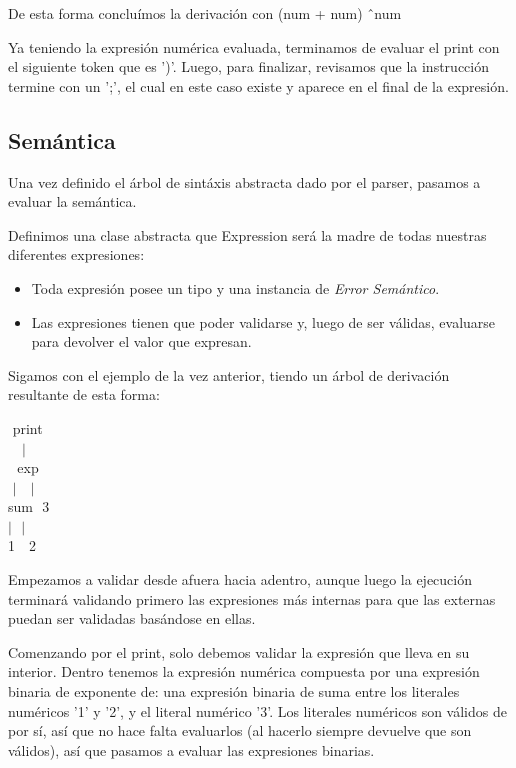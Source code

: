 \documentclass[12pt]{article}
\begin{document}
	De esta forma concluímos la derivación con (num + num) \^\ num
	
	Ya teniendo la expresión numérica evaluada, terminamos de evaluar el print con el siguiente token que es ')'.
	Luego, para finalizar, revisamos que la instrucción termine con un ';', el cual en este caso existe y aparece en el final de la expresión.
	
\subsection*{Semántica}
	Una vez definido el árbol de sintáxis abstracta dado por el parser, pasamos a evaluar la semántica.
	
	Definimos una clase abstracta que Expression será la madre de todas nuestras diferentes expresiones:
\begin{itemize}
	\item Toda expresión posee un tipo y una instancia de \emph{Error Semántico}.
	\item Las expresiones tienen que poder validarse y, luego de ser válidas, evaluarse para devolver el valor que expresan.
\end{itemize}

	Sigamos con el ejemplo de la vez anterior, tiendo un árbol de derivación resultante de esta forma:
	
	\begin{center}
			$ $ print $ $ \\
	$ $ $ $ $ $ $|$ $ $ $ $ \\
		$ $ $ $ exp $ $ \\
	$ $ $|$ $ $ $ $ $|$ $ $ \\
	sum $ $ 3 $ $ $ $ \\
	$|$ $ $ $|$ $ $ $ $ $ $ $ $ $ $\\
	1 $ $ $ $ 2 $ $ $ $ $ $ $ $ $ $\\
	\end{center}
	
	Empezamos a validar desde afuera hacia adentro, aunque luego la ejecución terminará validando primero las expresiones más internas para que las externas puedan ser validadas basándose en ellas.
	
	Comenzando por el print, solo debemos validar la expresión que lleva en su interior.
	Dentro tenemos la expresión numérica compuesta por una expresión binaria de exponente de: una expresión binaria de suma entre los literales numéricos '1' y '2', y el literal numérico '3'.
	Los literales numéricos son válidos de por sí, así que no hace falta evaluarlos (al hacerlo siempre devuelve que son válidos), así que pasamos a evaluar las expresiones binarias.
	
\end{document}
